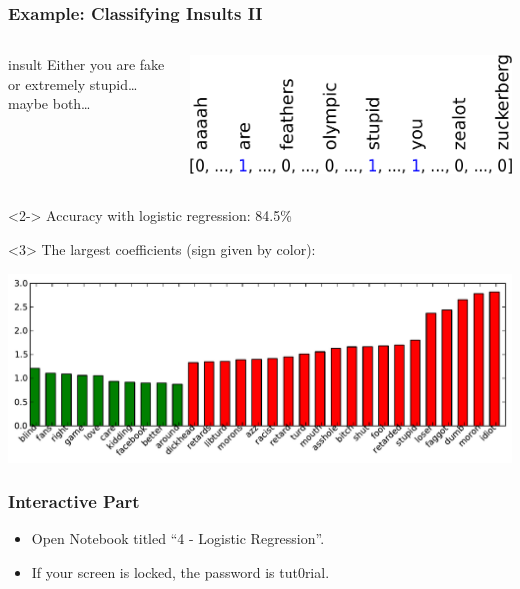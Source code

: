 \begin{frame}[t]
    \frametitle{Example: Classifying Insults II}
    \begin{columns}[t]
            \begin{beamercolorbox}[sep=1em,wd=5cm]{insult}
                Either you are fake or extremely stupid\dots maybe both\dots\\
            \end{beamercolorbox}
            \includegraphics[width=.9\linewidth]{logreg-pics/bag_of_words-crop}\\
            
    \end{columns}
    \vspace{3mm}
    \begin{onlyenv}<2->
        Accuracy with logistic regression: 84.5\%\\
    \end{onlyenv}
    \vspace{3mm}
    \begin{onlyenv}<3>
        The largest coefficients (sign given by color):
        \begin{center}
            \includegraphics[width=.9\linewidth]{logreg-pics/bow_coef}
        \end{center}
    \end{onlyenv}
\end{frame}

\begin{frame}
  \frametitle{Interactive Part}
  \begin{itemize}
      \item Open Notebook titled ``4 - Logistic Regression''.
      \item If your screen is locked, the password is tut0rial.
  \end{itemize}
\end{frame}
